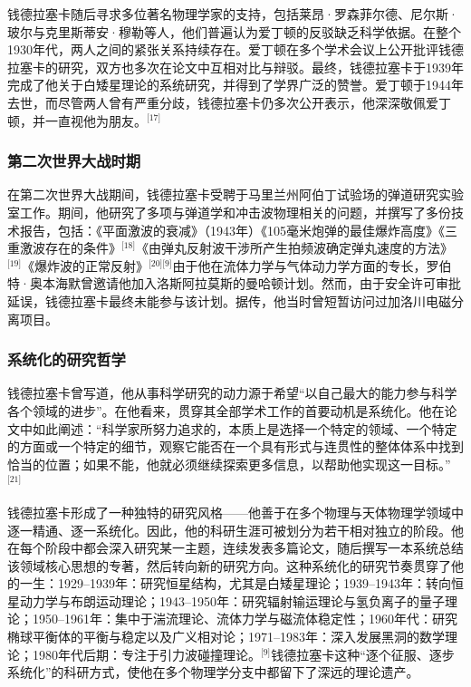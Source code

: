 钱德拉塞卡随后寻求多位著名物理学家的支持，包括莱昂·罗森菲尔德、尼尔斯·玻尔与克里斯蒂安·穆勒等人，他们普遍认为爱丁顿的反驳缺乏科学依据。在整个1930年代，两人之间的紧张关系持续存在。爱丁顿在多个学术会议上公开批评钱德拉塞卡的研究，双方也多次在论文中互相对比与辩驳。最终，钱德拉塞卡于1939年完成了他关于白矮星理论的系统研究，并得到了学界广泛的赞誉。爱丁顿于1944年去世，而尽管两人曾有严重分歧，钱德拉塞卡仍多次公开表示，他深深敬佩爱丁顿，并一直视他为朋友。\(^\text{[17]}\)
\subsubsection{第二次世界大战时期}
在第二次世界大战期间，钱德拉塞卡受聘于马里兰州阿伯丁试验场的弹道研究实验室工作。期间，他研究了多项与弹道学和冲击波物理相关的问题，并撰写了多份技术报告，包括：《平面激波的衰减》（1943年）《105毫米炮弹的最佳爆炸高度》《三重激波存在的条件》\(^\text{[18]}\)《由弹丸反射波干涉所产生拍频波确定弹丸速度的方法》\(^\text{[19]}\)《爆炸波的正常反射》\(^\text{[20][9]}\)由于他在流体力学与气体动力学方面的专长，罗伯特·奥本海默曾邀请他加入洛斯阿拉莫斯的曼哈顿计划。然而，由于安全许可审批延误，钱德拉塞卡最终未能参与该计划。据传，他当时曾短暂访问过加洛川电磁分离项目。
\subsubsection{系统化的研究哲学}
钱德拉塞卡曾写道，他从事科学研究的动力源于希望“以自己最大的能力参与科学各个领域的进步”。在他看来，贯穿其全部学术工作的首要动机是系统化。他在论文中如此阐述：“科学家所努力追求的，本质上是选择一个特定的领域、一个特定的方面或一个特定的细节，观察它能否在一个具有形式与连贯性的整体体系中找到恰当的位置；如果不能，他就必须继续探索更多信息，以帮助他实现这一目标。”\(^\text{[21]}\)

钱德拉塞卡形成了一种独特的研究风格——他善于在多个物理与天体物理学领域中逐一精通、逐一系统化。因此，他的科研生涯可被划分为若干相对独立的阶段。他在每个阶段中都会深入研究某一主题，连续发表多篇论文，随后撰写一本系统总结该领域核心思想的专著，然后转向新的研究方向。这种系统化的研究节奏贯穿了他的一生：1929–1939年：研究恒星结构，尤其是白矮星理论；1939–1943年：转向恒星动力学与布朗运动理论；1943–1950年：研究辐射输运理论与氢负离子的量子理论；1950–1961年：集中于湍流理论、流体力学与磁流体稳定性；1960年代：研究椭球平衡体的平衡与稳定以及广义相对论；1971–1983年：深入发展黑洞的数学理论；1980年代后期：专注于引力波碰撞理论。\(^\text{[9]}\)钱德拉塞卡这种“逐个征服、逐步系统化”的科研方式，使他在多个物理学分支中都留下了深远的理论遗产。
